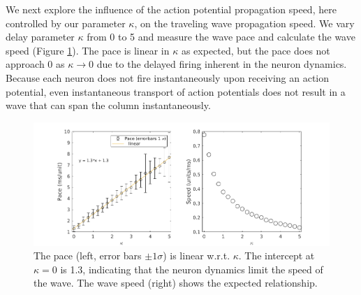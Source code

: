 \documentclass[12pt]{article}
\begin{document}
We next explore the influence of the action potential propagation speed, here controlled by our parameter $\kappa$, on the traveling wave propagation speed.
We vary delay parameter $\kappa$ from 0 to 5 and measure the wave pace and calculate the wave speed (Figure \ref{fig:delay_speed}).
The pace is linear in $\kappa$ as expected, but the pace does not approach $0$ as $\kappa \rightarrow 0$ due to the delayed firing inherent in the neuron dynamics.
Because each neuron does not fire instantaneously upon receiving an action potential, even instantaneous transport of action potentials does not result in a wave that can span the column instantaneously.
\begin{figure}[!htb]
 \caption{The pace (left, error bars $\pm 1 \sigma$) is linear w.r.t. $\kappa$. The intercept at $\kappa=0$ is 1.3, indicating that the neuron dynamics limit the speed of the wave. The wave speed (right) shows the expected relationship. }
 \label{fig:delay_speed}
 \centering
   \includegraphics[width=\textwidth]{fig/WaveSpeed_Delay}
\end{figure}
\color{red} 
\FloatBarrier
\end{document}
